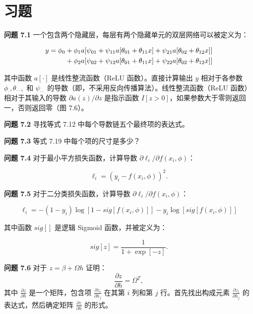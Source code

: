\documentclass[lang=cn,newtx,10pt,scheme=chinese]{elegantbook}
\begin{document}
\section{习题}  
\textbf{问题 7.1} 一个包含两个隐藏层，每层有两个隐藏单元的双层网络可以被定义为：

\begin{align}
y = \phi_0 &+ \phi_1a[\psi_{01} + \psi_{11}a[\theta_{01} + \theta_{11}x] + \psi_{21}a[\theta_{02} + \theta_{12}x]] \notag \\
&+ \phi_2a[\psi_{02} + \psi_{12}a[\theta_{01} + \theta_{11}x] + \psi_{22}a[\theta_{02} + \theta_{12}x]] 
\end{align} 


其中函数 \(a[\cdot]\) 是线性整流函数（ReLU 函数）。直接计算输出 \(y\) 相对于各参数 \(\phi_\cdot, \theta_{\cdot\cdot},\) 和 \(\psi_{\cdot\cdot}\) 的导数（即，不采用反向传播算法）。线性整流函数（ReLU 函数）相对于其输入的导数 \(\partial a(z)/\partial z\) 是指示函数 \(I[z > 0]\)，如果参数大于零则返回一，否则返回零（图 7.6）。

\textbf{问题 7.2} 寻找等式 7.12 中每个导数链五个最终项的表达式。

\textbf{问题 7.3} 等式 7.19 中每个项的尺寸是多少？

\textbf{问题 7.4} 对于最小平方损失函数，计算导数 \(\partial\ell_i/\partial f(x_i, \phi)\)：

\begin{equation}
\ell_i = (y_i - f(x_i, \phi))^2. 
\end{equation}

\textbf{问题 7.5} 对于二分类损失函数，计算导数 \(\partial\ell_i/\partial f(x_i, \phi)\)：

\begin{equation}
\ell_i = -(1 - y_i)\log [ 1 - sig[f(x_i, \phi)] ] - y_i \log [sig[f(x_i, \phi)] ] 
\end{equation}

其中函数 \(sig[]\) 是逻辑 Sigmoid 函数，并被定义为：

\begin{equation}
sig[z] = \frac{1}{1 + \exp[-z]}. 
\end{equation}


\textbf{问题 7.6} 对于 \(z = \beta + \Omega h\) 证明：
\begin{equation*}
\frac{\partial z}{\partial h} = \Omega^T,
\end{equation*}
其中 \(\frac{\partial z}{\partial h}\) 是一个矩阵，包含项 \(\frac{\partial z_i}{\partial h_j}\) 在其第 \(i\) 列和第 \(j\) 行。首先找出构成元素 \(\frac{\partial z_i}{\partial h_j}\) 的表达式，然后确定矩阵 \(\frac{\partial z}{\partial h}\) 的形式。
\end{document}
